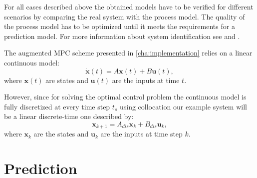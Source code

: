 For all cases described above the obtained models have to be verified for different scenarios by comparing the real system with the process model.
The quality of the process model has to be optimized until it meets the requirements for a prediction model.
For more information about system identification see \cite{Isermann.2011} and \cite{Ljung.2012}.

The augmented MPC scheme presented in \cref{cha:implementation} relies on a linear continuous model:
\begin{equation}\label{eq:linss_cont}
\dot{\mathbf{x}}(t) = A\mathbf{x}(t)+B\mathbf{u}(t),
\end{equation}
where $\mathbf{x}(t)$ are states and $\mathbf{u}(t)$ are the inputs at time $t$.

However, since for solving the optimal control problem the continuous model is fully discretized at every time step $t_s$ using collocation our example system will be a linear discrete-time one described by:
\begin{equation}\label{eq:linss}
\mathbf{x}_{k+1}=A_{dis}\mathbf{x}_k+B_{dis}\mathbf{u}_k,
\end{equation}
where $\mathbf{x}_k$ are the states and $\mathbf{u}_k$ are the inputs at time step $k$.


\section{Prediction}
\label{sec:prediction}

